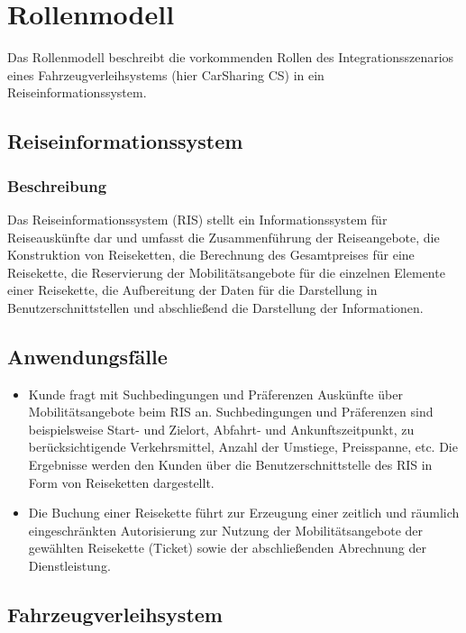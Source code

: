 \chapter{Rollenmodell}
\label{sec:Rollenmodell}

Das Rollenmodell beschreibt die vorkommenden Rollen des Integrationsszenarios eines Fahrzeugverleihsystems (hier CarSharing CS) in ein Reiseinformationssystem.

\section{Reiseinformationssystem}

\subsection{Beschreibung}
Das Reiseinformationssystem (RIS) stellt ein Informationssystem für Reiseauskünfte dar und umfasst die Zusammenführung der Reiseangebote, die Konstruktion von Reiseketten, die Berechnung des Gesamtpreises für eine Reisekette, die Reservierung der Mobilitätsangebote für die einzelnen Elemente einer Reisekette, die Aufbereitung der Daten für die Darstellung in Benutzerschnittstellen und abschließend die Darstellung der Informationen.

\section{Anwendungsfälle}
\begin{itemize}
\item Kunde fragt mit Suchbedingungen und Präferenzen Auskünfte über Mobilitätsangebote beim RIS an. Suchbedingungen und Präferenzen sind beispielsweise Start- und Zielort, Abfahrt- und Ankunftszeitpunkt, zu berücksichtigende Verkehrsmittel, Anzahl der Umstiege, Preisspanne, etc. Die Ergebnisse werden den Kunden über die Benutzerschnittstelle des RIS in Form von Reiseketten dargestellt. 
\item Die Buchung einer Reisekette führt zur Erzeugung einer zeitlich und räumlich eingeschränkten Autorisierung  zur Nutzung der Mobilitätsangebote der gewählten Reisekette (Ticket) sowie der abschließenden Abrechnung der Dienstleistung.
\end{itemize}

\section{Fahrzeugverleihsystem}

